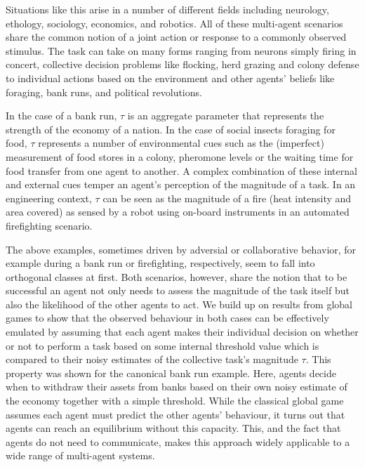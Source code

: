 \documentclass{nature}
\begin{document}
Situations like this arise in a number of different fields including neurology\cite{Yoshida2010, Suzuki2015}, ethology\cite{Robinson1987, Gordon1996, Bonabeau1998, Theraulaz1998}, sociology\cite{Raafat2009}, economics\cite{Morris2000}, and robotics\cite{Martinoli1999, Krieger2000, Kube2000, Pynadath2002, Gerkey2003, Mataric2003, Gerkey2004, Kanakia2014}. All of these multi-agent scenarios share the common notion of a joint action or response to a commonly observed stimulus. The task can take on many forms ranging from neurons simply firing in concert, collective decision problems like flocking, herd grazing and colony defense to individual actions based on the environment and other agents' beliefs like foraging, bank runs, and political revolutions. 

In the case of a bank run\cite{Morris2000}, $\tau$ is an aggregate parameter that represents the strength of the economy of a nation. In the case of social insects foraging for food\cite{Bonabeau1996, Theraulaz1998, Krieger2000}, $\tau$ represents a number of environmental cues such as the (imperfect) measurement of food stores in a colony, pheromone levels\cite{Robinson1987} or the waiting time for food transfer from one agent to another\cite{Seeley1989}. A complex combination of these internal and external cues\cite{Gordon1996} temper an agent's perception of the magnitude of a task. In an engineering context, $\tau$ can be seen as the magnitude of a fire (heat intensity and area covered) as sensed by a robot using on-board instruments in an automated firefighting scenario\cite{Kanakia2014}. 

The above examples, sometimes driven by adversial or collaborative behavior, for example during a bank run or firefighting, respectively, seem to fall into orthogonal classes at first. 
Both scenarios, however, share the notion that to be successful an agent not only needs to assess the magnitude of the task itself but also the likelihood of the other agents to act. We build up on results from global games\cite{Carlsson1993} to show that the observed behaviour in both cases can be effectively emulated by assuming that each agent makes their individual decision on whether or not to perform a task based on some internal threshold value which is compared to their noisy estimates of the collective task's magnitude $\tau$. This property was shown for the canonical bank run example\cite{Morris2000}. Here, agents decide when to withdraw their assets from banks based on their own noisy estimate of the economy together with a simple threshold.  While the classical global game assumes each agent must predict the other agents' behaviour, it turns out that agents can reach an equilibrium without this capacity. This, and the fact that agents do not need to communicate, makes this approach widely applicable to a wide range of multi-agent systems.
\end{document}
